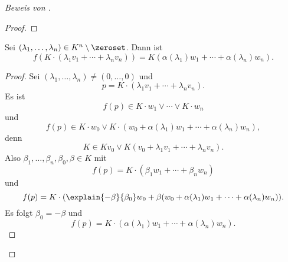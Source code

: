 \begin{proof}[Beweis von ]
\begin{proof}
  \end{proof}
  \begin{lemma}\label{kollineation_mit_automorphismus_verhaelt_sich_gut_auf_teilbasis}
    Sei \( (\lambda_1,\dotsc,\lambda_n)\in K^n\setminus \zeroset \). Dann ist 
    \begin{equation*}
      f(K\cdot (\lambda_1 v_1+\dotsb+\lambda_n v_n))=K\nonumber (\alpha(\lambda_1)w_1+\dotsb+\alpha(\lambda_n)w_n).
    \end{equation*}
  \end{lemma}
  \begin{proof}
    Sei \( (\lambda_1,\dotsc,\lambda_n)\neq (0,\dotsc,0) \) und
    \begin{equation*}
      p=K\cdot(\lambda_1 v_1+\dotsb+\lambda_n v_n).
    \end{equation*}
    Es ist
    \begin{equation*}
      f(p)\in K\cdot w_1\vee \dotsb\vee K\cdot w_n
    \end{equation*}
    und
    \begin{equation*}
      f(p)\in K\cdot w_0\vee K\cdot(w_0+\alpha(\lambda_1)w_1+\dotsb+\alpha(\lambda_n)w_n),
    \end{equation*}
    denn
    \begin{equation*}
      K\in Kv_0\vee K(v_0+\lambda_1 v_1+\dotsb+\lambda_n v_n).
    \end{equation*}
    Also \texists \( \beta_1,\dotsc,\beta_n,\beta_0,\beta\in K \) mit
    \begin{equation*}
      f(p)=K\cdot(\beta_1 w_1+\dotsb+\beta_n w_n)
    \end{equation*}
    und
    \begin{equation*}
      f(p)=K\cdot (\explain{-\beta}{\beta_0}w_0+\beta(w_0+\alpha(\lambda_1)w_1+\dotsb+\alpha(\lambda_n)w_n)).
    \end{equation*}
    Es folgt \( \beta_0=-\beta \) und
    \begin{equation*}
      f(p)=K\cdot (\alpha(\lambda_1)w_1+\dotsb+\alpha(\lambda_n)w_n).
    \end{equation*}
      

\end{proof}
\end{proof}
